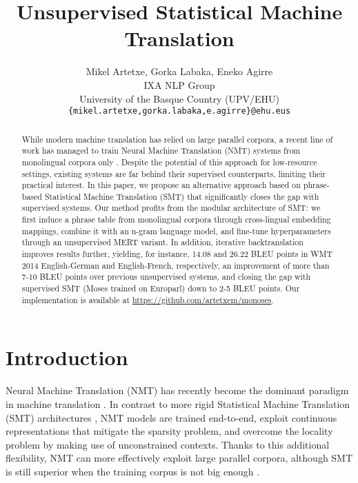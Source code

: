 \documentclass[11pt,a4paper]{article}
\title{Unsupervised Statistical Machine Translation}
\author{Mikel Artetxe, Gorka Labaka, Eneko Agirre \\
IXA NLP Group \\
University of the Basque Country (UPV/EHU) \\
\texttt{\{mikel.artetxe,gorka.labaka,e.agirre\}@ehu.eus} \\
}
\date{}
\begin{document}
\maketitle
\begin{abstract}
While modern machine translation has relied on large parallel corpora, a recent line of work has managed to train Neural Machine Translation (NMT) systems from monolingual corpora only \citep{artetxe2018unsupervised,lample2018unsupervised}. Despite the potential of this approach for low-resource settings, existing systems are far behind their supervised counterparts, limiting their practical interest. In this paper, we propose an alternative approach based on phrase-based Statistical Machine Translation (SMT) that significantly closes the gap with supervised systems. Our method profits from the modular architecture of SMT: we first induce a phrase table from monolingual corpora through cross-lingual embedding mappings, combine it with an n-gram language model, and fine-tune hyperparameters through an unsupervised MERT variant. In addition, iterative backtranslation improves results further, yielding, for instance, 14.08 and 26.22 BLEU points in WMT 2014 English-German and English-French, respectively, an improvement of more than 7-10 BLEU points over previous unsupervised systems, and closing the gap with supervised SMT (Moses trained on Europarl) down to 2-5 BLEU points. Our implementation is available at \url{https://github.com/artetxem/monoses}.
\end{abstract}


\section{Introduction}

Neural Machine Translation (NMT) has recently become the dominant paradigm in machine translation \cite{vaswani2017attention}. In contrast to more rigid Statistical Machine Translation (SMT) architectures \cite{koehn2003statistical}, NMT models are trained end-to-end, exploit continuous representations that mitigate the sparsity problem, and overcome the locality problem by making use of unconstrained contexts. Thanks to this additional flexibility, NMT can more effectively exploit large parallel corpora, although SMT is still superior when the training corpus is not big enough \citep{koehn2017six}.
\end{document}
